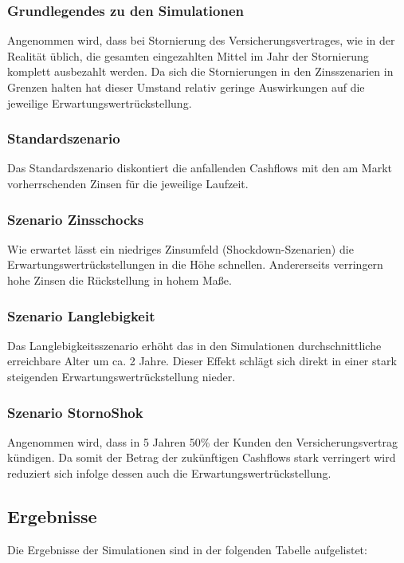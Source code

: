 \documentclass[parskip,12pt,paper=a4]{scrartcl}
\begin{document}
\subsubsection{Grundlegendes zu den Simulationen}
Angenommen wird, dass bei Stornierung des Versicherungsvertrages, wie in der Realität üblich, die gesamten eingezahlten Mittel im Jahr der Stornierung komplett ausbezahlt werden. Da sich die Stornierungen in den Zinsszenarien in Grenzen halten hat dieser Umstand relativ geringe Auswirkungen auf die jeweilige Erwartungswertrückstellung.

\subsubsection{Standardszenario}
Das Standardszenario diskontiert die anfallenden Cashflows mit den am Markt vorherrschenden Zinsen für die jeweilige Laufzeit.
 
\subsubsection{Szenario Zinsschocks}
Wie erwartet lässt ein niedriges Zinsumfeld (Shockdown-Szenarien) die Erwartungswertrückstellungen in die Höhe schnellen. Andererseits verringern hohe Zinsen die Rückstellung in hohem Maße.

\subsubsection{Szenario Langlebigkeit}
Das Langlebigkeitsszenario erhöht das in den Simulationen durchschnittliche erreichbare Alter um ca. 2 Jahre. Dieser Effekt schlägt sich direkt in einer stark steigenden Erwartungswertrückstellung nieder.  

\subsubsection{Szenario StornoShok}
Angenommen wird, dass in 5 Jahren 50\% der Kunden den Versicherungsvertrag kündigen. Da somit der Betrag der zukünftigen Cashflows stark verringert wird reduziert sich infolge dessen auch die Erwartungswertrückstellung.

\newpage
\subsection{Ergebnisse}

Die Ergebnisse der Simulationen sind in der folgenden Tabelle aufgelistet:
\end{document}
